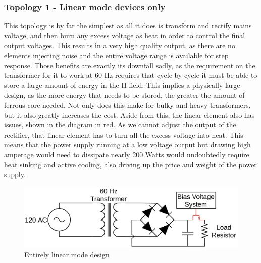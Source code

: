 \documentclass{article}
\begin{document}
\subsubsection{Topology 1 - Linear mode devices only}
This topology is by far the simplest as all it does is transform and rectify mains 
voltage, and then burn any excess voltage as heat in order to control the final 
output voltages. This results in a very high quality output, as there are no elements 
injecting noise and the entire voltage range is available for step response. 
Those benefits are exactly its downfall sadly, as the requirement on the transformer 
for it to work at 60 Hz requires that cycle by cycle it must be able to store a 
large amount of energy in the H-field. This implies a physically large design, as 
the more energy that needs to be stored, the greater the amount of ferrous core needed. 
Not only does this make for bulky and heavy transformers, but it also greatly increases 
the cost. Aside from this, the linear element also has issues, shown in the diagram 
in red. As we cannot adjust the output of the rectifier, that linear element has to 
turn all the excess voltage into heat. This means that the power supply running at 
a low voltage output but drawing high amperage would need to dissipate nearly 200 
Watts would undoubtedly require heat sinking and active cooling, also driving up 
the price and weight of the power supply.

\begin{figure}[H]
    \includegraphics[width=\textwidth]{linear}
    \caption{Entirely linear mode design}
    \label{fig:linear}
\end{figure}
\end{document}
